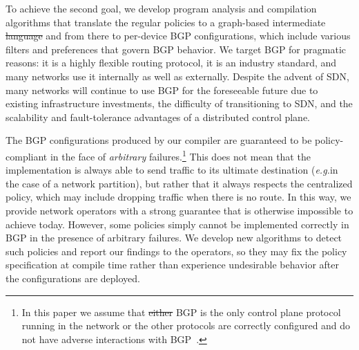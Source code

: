 \documentclass{sig-alternate-10pt}
\newcommand{\EG}{\emph{e.g.}}
\providecommand{\DIFadd}[1]{{\protect\color{blue}\uwave{#1}}} %
\providecommand{\DIFdel}[1]{{\protect\color{red}\sout{#1}}}                      %
\providecommand{\DIFaddbegin}{} %
\providecommand{\DIFaddend}{} %
\providecommand{\DIFdelbegin}{} %
\providecommand{\DIFdelend}{} %
\begin{document}

To achieve the second goal, we develop program analysis and compilation
algorithms that translate the regular policies to a graph-based
intermediate \DIFdelbegin \DIFdel{language }\DIFdelend \DIFaddbegin \DIFadd{representation }\DIFaddend and from there to per-device BGP configurations, which include various filters and preferences that govern BGP behavior.
We target BGP for pragmatic reasons:
it is a highly flexible routing protocol,
it is an industry standard,
and many networks use it internally as well as externally.
Despite the advent of SDN, many networks will continue to
use BGP for the foreseeable future due to existing infrastructure investments, the difficulty of transitioning to SDN, and the scalability and fault-tolerance advantages of a distributed
control plane.

The BGP configurations produced by our compiler are
guaranteed to be policy-compliant in the face of
{\em arbitrary} failures.\footnote{In this paper we assume that \DIFdelbegin \DIFdel{either }\DIFdelend BGP is the only control plane protocol running in the network or the other protocols are correctly configured and do not have adverse interactions with BGP~\cite{igp-correctness1,igp-correctness2}.} This does not mean that the implementation is always
able to send traffic to its ultimate destination
(\EG in the case of a network partition), but rather that it always respects the
centralized policy, which may include dropping traffic when there is no route.
%
In this way, we provide network operators
with a strong guarantee that is otherwise impossible to achieve
today.
However, some policies simply cannot be implemented correctly in BGP in
 the presence of arbitrary failures.  We develop new
algorithms to detect such policies
and report our findings to the operators, so they may fix the policy
specification at compile time rather than experience undesirable
behavior after the configurations are deployed.
\end{document}
